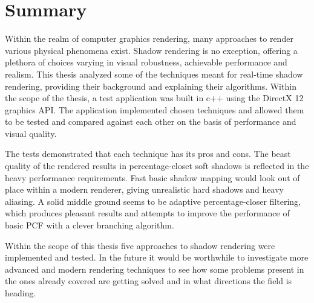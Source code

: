 \chapter{Summary}
\label{section:chapter_5}



Within the realm of computer graphics rendering, many approaches to render various physical phenomena exist. Shadow rendering is no exception, offering a plethora of choices varying in visual robustness, achievable performance and realism. This thesis analyzed some of the techniques meant for real-time shadow rendering, providing their background and explaining their algorithms. Within the scope of the thesis, a test application was built in c++ using the DirectX 12 graphics API. The application implemented chosen techniques and allowed them to be tested and compared against each other on the basis of performance and visual quality.

The tests demonstrated that each technique has its pros and cons. The beast  quality of the rendered results in percentage-closet soft shadows is reflected in the heavy performance requirements. Fast basic shadow mapping would look out of place within a modern renderer, giving unrealistic hard shadows and heavy aliasing. A solid middle ground seems to be adaptive percentage-closer filtering, which produces pleasant results and attempts to improve the performance of basic PCF with a clever branching algorithm.

Within the scope of this thesis five approaches to shadow rendering were implemented and tested. In the future it would be worthwhile to investigate more advanced and modern rendering techniques to see how some problems present in the ones already covered are getting solved and in what directions the field is heading.